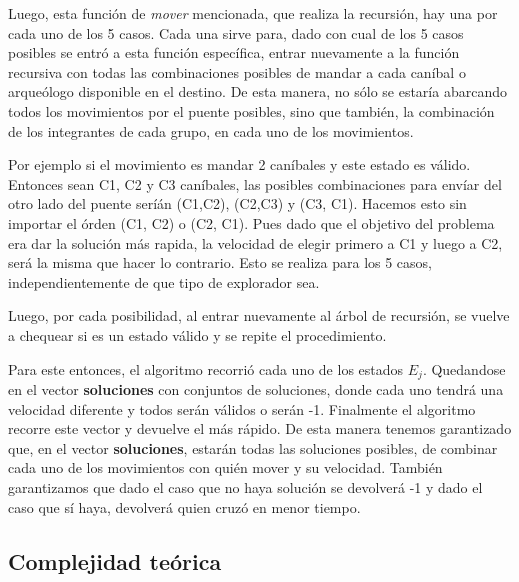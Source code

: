        Luego, esta función de \emph{mover} mencionada, que realiza la recursión, hay una por cada uno de los 5 casos. Cada una sirve para, dado con cual de los 5 casos posibles se entró a esta función específica, entrar nuevamente a la función recursiva con todas las combinaciones posibles de mandar a cada caníbal o arqueólogo disponible en el destino. De esta manera, no sólo se estaría abarcando todos los movimientos por el puente posibles, sino que también, la combinación de los integrantes de cada grupo, en cada uno de los movimientos.

       Por ejemplo si el movimiento es mandar 2 caníbales y este estado es válido. Entonces sean C1, C2 y C3 caníbales, las posibles combinaciones para envíar del otro lado del puente seríán (C1,C2), (C2,C3) y (C3, C1). Hacemos esto sin importar el órden (C1, C2) o (C2, C1). Pues dado que el objetivo del problema era dar la solución más rapida, la velocidad de elegir primero a C1 y luego a C2, será la misma que hacer lo contrario. Esto se realiza para los 5 casos, independientemente de que tipo de explorador sea.

       Luego, por cada posibilidad, al entrar nuevamente al árbol de recursión, se vuelve a chequear si es un estado válido y se repite el procedimiento. 

       Para este entonces, el algoritmo recorrió cada uno de los estados $E_{j}$. Quedandose en el vector \textbf{soluciones} con conjuntos de soluciones, donde cada uno tendrá una velocidad diferente y todos serán válidos o serán -1. Finalmente el algoritmo recorre este vector y devuelve el más rápido. De esta manera tenemos garantizado que, en el vector \textbf{soluciones}, estarán todas las soluciones posibles, de combinar cada uno de los movimientos con quién mover y su velocidad. También garantizamos que dado el caso que no haya solución se devolverá -1 y dado el caso que sí haya, devolverá quien cruzó en menor tiempo.



    \subsection{Complejidad teórica}

